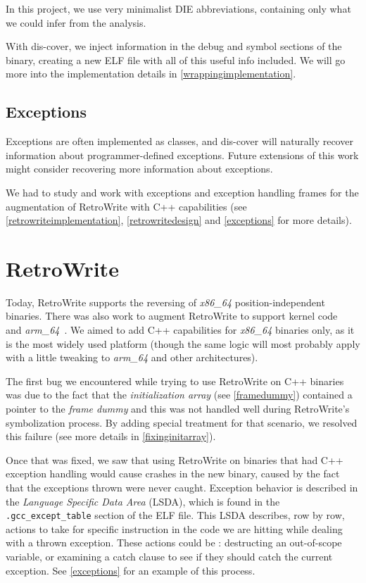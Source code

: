\documentclass[a4paper,11pt,oneside]{report}
\newcommand{\lou}[1]{\todo[inline,color=green!40]{Louis: #1}}
\begin{document}
In this project, we use very minimalist DIE abbreviations, containing only
what we could infer from the analysis.

With dis-cover, we inject information in the debug and symbol sections of the
binary, creating a new ELF file with all of this useful info included.
We will go more into the implementation details in 
\autoref{wrappingimplementation}.

\subsection{Exceptions}

Exceptions are often implemented as classes, and dis-cover will naturally 
recover information about programmer-defined exceptions.
Future extensions of this work might consider recovering more information about 
exceptions.

We had to study and work with exceptions and exception handling frames for 
the augmentation of RetroWrite with C++ capabilities
(see \autoref{retrowriteimplementation}, \autoref{retrowritedesign} and
\autoref{exceptions} for more details).


\section{RetroWrite}
\label{retrowritedesign}

Today, RetroWrite supports the reversing of \emph{x86\_64}
position-independent binaries.
There was also work to augment RetroWrite to support kernel 
code~\cite{rwkernel} and \emph{arm\_64}~\cite{rwarm}.
We aimed to add C++ capabilities for \emph{x86\_64} binaries only, as it is
the most widely used platform (though the same logic will most probably apply
with a little tweaking to \emph{arm\_64} and other architectures).

The first bug we encountered while trying to use RetroWrite on C++ binaries
was due to the fact that the \emph{initialization array} (see
\autoref{framedummy}) contained a pointer to the \emph{frame dummy} and this
was not handled well during RetroWrite's symbolization process.
By adding special treatment for that scenario, we resolved this failure (see
more details in \autoref{fixinginitarray}).

Once that was fixed, we saw that using RetroWrite on binaries that had C++
exception handling would cause crashes in the new binary, caused by the fact
that the exceptions thrown were never caught.
Exception behavior is described in the \emph{Language Specific Data Area}
(LSDA), which is found in the \texttt{.gcc\_except\_table} section of the ELF
file.
\lou{TODO say that it would point to nothing and crash}
This LSDA describes, row by row, actions to take for specific instruction in
the code we are hitting while dealing with a thrown exception. These actions
could be : destructing an out-of-scope variable, or examining a catch clause
to see if they should catch the current exception. See \autoref{exceptions}
for an example of this process.
\end{document}
